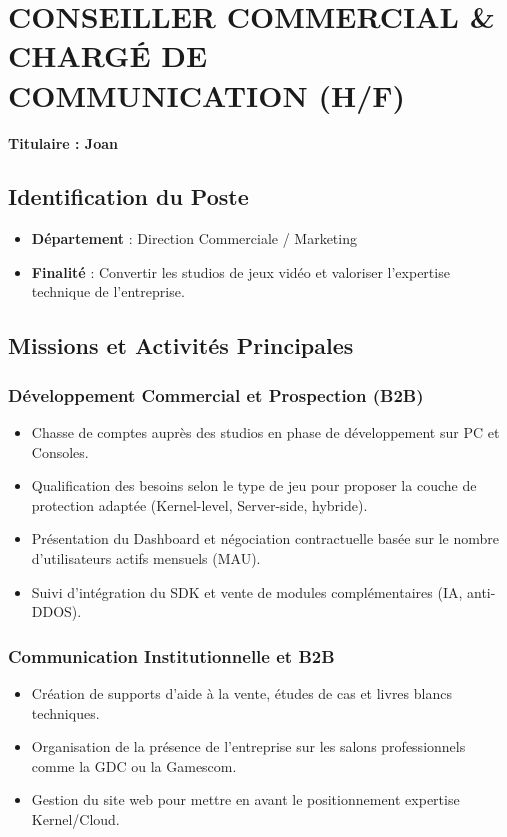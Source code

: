 \documentclass[12pt,a4paper]{article}
\begin{document}
\newpage

\section{CONSEILLER COMMERCIAL \& CHARGÉ DE COMMUNICATION (H/F)}
\textbf{Titulaire : Joan}

\subsection{Identification du Poste}
\begin{itemize}[label=\textbullet]
    \item \textbf{Département} : Direction Commerciale / Marketing
    \item \textbf{Finalité} : Convertir les studios de jeux vidéo et valoriser l'expertise technique de l'entreprise.
\end{itemize}

\subsection{Missions et Activités Principales}

\subsubsection{Développement Commercial et Prospection (B2B)}
\begin{itemize}[label=\textbullet]
    \item Chasse de comptes auprès des studios en phase de développement sur PC et Consoles.
    \item Qualification des besoins selon le type de jeu pour proposer la couche de protection adaptée (Kernel-level, Server-side, hybride).
    \item Présentation du Dashboard et négociation contractuelle basée sur le nombre d'utilisateurs actifs mensuels (MAU).
    \item Suivi d'intégration du SDK et vente de modules complémentaires (IA, anti-DDOS).
\end{itemize}

\subsubsection{Communication Institutionnelle et B2B}
\begin{itemize}[label=\textbullet]
    \item Création de supports d'aide à la vente, études de cas et livres blancs techniques.
    \item Organisation de la présence de l'entreprise sur les salons professionnels comme la GDC ou la Gamescom.
    \item Gestion du site web pour mettre en avant le positionnement expertise Kernel/Cloud.
\end{itemize}
\end{document}
